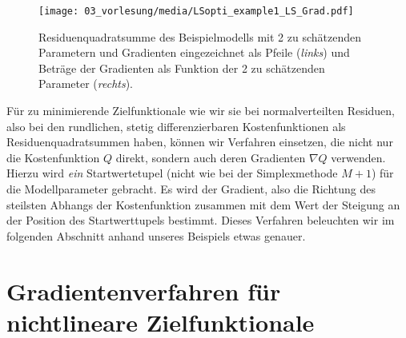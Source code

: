 \begin{figure}
\begin{center}
\texttt{[image: 03\_vorlesung/media/LSopti\_example1\_LS\_Grad.pdf]}
\end{center}
\caption{Residuenquadratsumme des Beispielmodells mit 2 zu schätzenden Parametern
und Gradienten eingezeichnet als Pfeile (\textsl{links}) und Beträge der
Gradienten als Funktion der 2 zu schätzenden Parameter (\textsl{rechts}).\label{LSoptiExample1Grad}}
\end{figure}
Für zu minimierende Zielfunktionale wie wir sie bei normalverteilten Residuen, also bei
den rundlichen, stetig differenzierbaren Kostenfunktionen als Residuenquadratsummen haben, können wir Verfahren
einsetzen, die nicht nur die Kostenfunktion $Q$ direkt, sondern auch deren Gradienten $\nabla Q$ verwenden.
Hierzu wird \textsl{ein} Startwertetupel (nicht wie bei der Simplexmethode $M+1$)
für die Modellparameter gebracht. Es wird der Gradient, also die Richtung des steilsten
Abhangs der Kostenfunktion zusammen mit dem Wert der Steigung an der Position des Startwerttupels
bestimmt. Dieses Verfahren beleuchten wir im folgenden Abschnitt anhand unseres Beispiels etwas genauer.

\section{Gradientenverfahren für nichtlineare Zielfunktionale}

